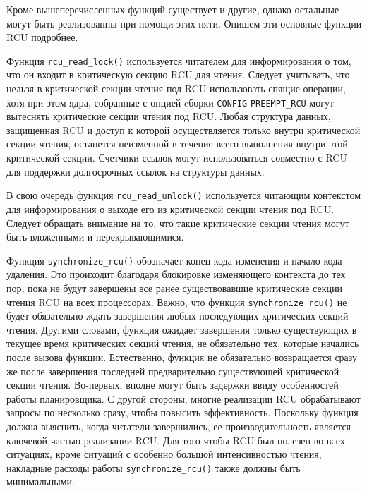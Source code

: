 Кроме вышеперечисленных функций существует и другие, однако остальные могут быть
реализованны при помощи этих пяти. Опишем эти основные функции RCU подробнее.

Функция \texttt{rcu\_read\_lock()} используется читателем для информирования о
том, что он входит в критическую секцию RCU для чтения. Следует учитывать, что
нельзя в критической секции чтения под RCU использовать спящие операции, хотя
при этом ядра, собранные с опцией cборки \texttt{CONFIG}-\texttt{PREEMPT\_RCU} могут вытеснять
критические секции чтения под RCU. Любая структура данных, защищенная RCU и
доступ к которой осуществляется только внутри критической секции чтения,
останется неизменной в течение всего выполнения внутри этой критической секции.
Счетчики ссылок могут использоваться совместно с RCU для поддержки долгосрочных
ссылок на структуры данных.

В свою очередь функция \texttt{rcu\_read\_unlock()} используется читающим
контекстом для информирования о выходе его из критической секции чтения под RCU.
Следует обращать внимание на то, что такие критические секции чтения могут быть
вложенными и перекрывающимися.

Функция \texttt{synchronize\_rcu()} обозначает конец кода изменения и начало
кода удаления. Это проиходит благодаря блокировке изменяющего контекста до тех
пор, пока не будут завершены все ранее существовавшие критические секции чтения
RCU на всех процессорах. Важно, что функция \texttt{synchronize\_rcu()} не будет
обязательно ждать завершения любых последующих критических секций чтения.
Другими словами, функция ожидает завершения только существующих в текущее время
критических секций чтения, не обязательно тех, которые начались после вызова
функции. Естественно, функция не обязательно возвращается сразу же после
завершения последней предварительно существующей критической секции чтения.
Во-первых, вполне могут быть задержки ввиду особенностей работы планировщика. С
другой стороны, многие реализации RCU обрабатывают запросы по несколько сразу,
чтобы повысить эффективность. Поскольку функция должна выяснить, когда читатели
завершились, ее производительность является ключевой частью реализации RCU. Для
того чтобы RCU был полезен во всех ситуациях, кроме ситуаций с особенно большой
интенсивностью чтения, накладные расходы работы \texttt{synchronize\_rcu()}
также должны быть минимальными.

